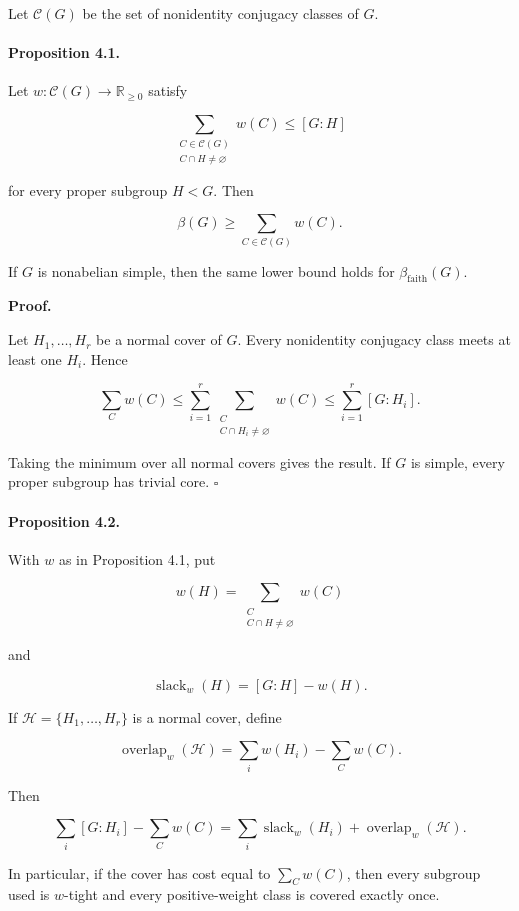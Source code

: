 \documentclass[11pt]{article}
\begin{document}
Let $\mathcal C(G)$ be the set of nonidentity conjugacy classes of $G$.

\paragraph{Proposition 4.1.}

Let $w:\mathcal C(G)\to\mathbb R_{\ge0}$ satisfy

\[
\sum_{\substack{C\in\mathcal C(G)\\ C\cap H\ne\varnothing}} w(C)
\le [G:H]
\]

for every proper subgroup $H<G$. Then

\[
\beta(G)\ge \sum_{C\in\mathcal C(G)}w(C).
\]

If $G$ is nonabelian simple, then the same lower bound holds for $\beta_{\mathrm{faith}}(G)$.

\noindent\textbf{Proof.}

Let $H_1,\dots,H_r$ be a normal cover of $G$. Every nonidentity conjugacy class meets at least one $H_i$. Hence

\[
\sum_C w(C)
\le
\sum_{i=1}^r
\sum_{\substack{C\\ C\cap H_i\ne\varnothing}}w(C)
\le
\sum_{i=1}^r [G:H_i].
\]

Taking the minimum over all normal covers gives the result. If $G$ is simple, every proper subgroup has trivial core. $\square$

\paragraph{Proposition 4.2.}

With $w$ as in Proposition 4.1, put

\[
w(H)=\sum_{\substack{C\\ C\cap H\ne\varnothing}}w(C)
\]

and

\[
\operatorname{slack}_w(H)=[G:H]-w(H).
\]

If $\mathcal H=\{H_1,\dots,H_r\}$ is a normal cover, define

\[
\operatorname{overlap}_w(\mathcal H)
=
\sum_i w(H_i)-\sum_C w(C).
\]

Then

\[
\sum_i [G:H_i]-\sum_C w(C)
=
\sum_i\operatorname{slack}_w(H_i)
+
\operatorname{overlap}_w(\mathcal H).
\]

In particular, if the cover has cost equal to $\sum_Cw(C)$, then every subgroup used is $w$-tight and every positive-weight class is covered exactly once.
\end{document}
